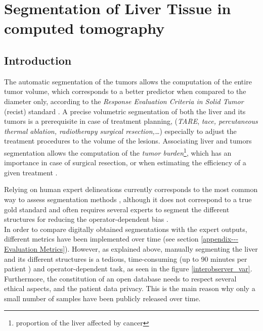 

\chapter{Segmentation of Liver Tissue in computed tomography} \label{SegSemantic}

\section{Introduction}


The automatic segmentation of the tumors allows the computation 
of the entire tumor volume, which corresponds to a better predictor when
compared to the diameter only, according to the \emph{Response
	Evaluation Criteria in Solid Tumor} (\ac{recist}) standard \cite{Eisenhauer2008, Ye2017}. A precise
volumetric segmentation of both the liver and its tumors is a
prerequisite in case of treatment planning, (\emph{TARE}, \emph{\ac{tace},
	percutaneous thermal ablation, radiotherapy surgical resection,\ldots{}}) especially to adjust the treatment procedures to the volume of the lesions\cite{Al-Nahhas2014, Yamada1983, Albain2009, Rossi96}. Associating liver and tumors
segmentation allows the computation of the \emph{tumor burden}\footnote{proportion of the liver affected by cancer}, which
has an importance in case of surgical resection, or when estimating the
efficiency of a given treatment \cite{Nordlinger1996, Jagannath1986, Gobbi2004, Bauknecht2010, Bornemann2007, Heussel2007, Kuhnigk2006, Puesken2010}.

Relying on human expert
delineations currently corresponds to the most common way to assess
segmentation methods \cite{Bilic2019}, although it does not correspond 
to a true gold standard \cite{Heimann2009} and often requires several experts to segment the
different structures for reducing the operator-dependent bias \cite{Echegaray2015, Moltz2009}.\\
In order to compare digitally obtained segmentations with the expert
outputs, different metrics have been implemented over time (see section \ref{appendix---Evaluation Metrics}). However, as
explained above, manually segmenting the liver and its different
structures is a tedious, time-consuming (up to 90 minutes per patient
\cite{Gotra2017}) and operator-dependent task, as seen in the figure \ref{interobserver_var}.
Furthermore, the constitution of an open database needs to respect
several ethical aspects, and the patient data privacy. This is the main
reason why only a small number of samples have been publicly released
over time.

